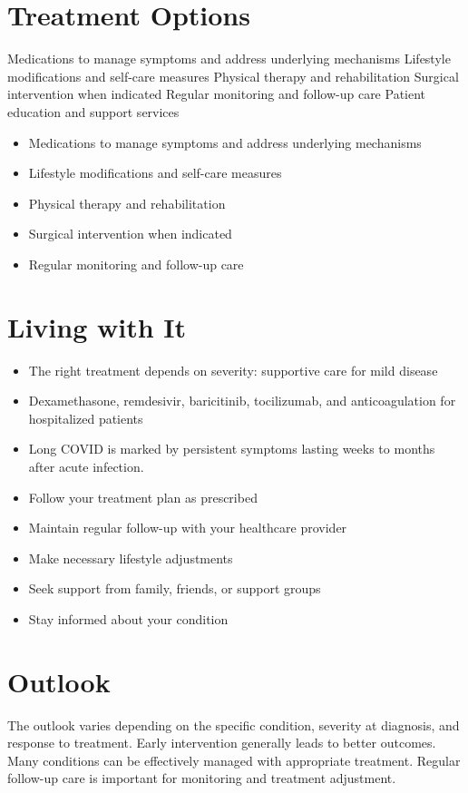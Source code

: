 \section{Treatment Options}
Medications to manage symptoms and address underlying mechanisms Lifestyle modifications and self-care measures Physical therapy and rehabilitation Surgical intervention when indicated Regular monitoring and follow-up care Patient education and support services

\begin{itemize}[noitemsep]
  \item Medications to manage symptoms and address underlying mechanisms
  \item Lifestyle modifications and self-care measures
  \item Physical therapy and rehabilitation
  \item Surgical intervention when indicated
  \item Regular monitoring and follow-up care
\end{itemize}
\section{Living with It}
\begin{itemize}[noitemsep]
  \item The right treatment depends on severity: supportive care for mild disease
  \item Dexamethasone, remdesivir, baricitinib, tocilizumab, and anticoagulation for hospitalized patients
  \item Long COVID is marked by persistent symptoms lasting weeks to months after acute infection.
  \item Follow your treatment plan as prescribed
  \item Maintain regular follow-up with your healthcare provider
  \item Make necessary lifestyle adjustments
  \item Seek support from family, friends, or support groups
  \item Stay informed about your condition
\end{itemize}
\section{Outlook}
The outlook varies depending on the specific condition, severity at diagnosis, and response to treatment. Early intervention generally leads to better outcomes. Many conditions can be effectively managed with appropriate treatment. Regular follow-up care is important for monitoring and treatment adjustment.
